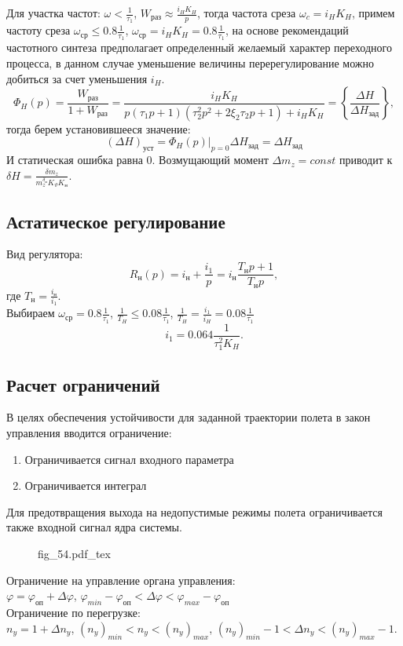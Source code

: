 \documentclass{article}
\newcommand{\incfig}[1]{
    {#1.pdf_tex}
}
\begin{document}
Для участка частот:
$\omega < \frac{1}{\tau_1}$, $W_\text{раз} \approx \frac{i_H K_H }{p} $, тогда
частота среза $\omega_c = i_H  K_H$, примем частоту среза $\omega_\text{ср} \le
	0.8 \frac{1}{\tau_1}$, $\omega_\text{ср} = i_H K_H =0.8 \frac{1}{\tau_1} $, на
основе рекомендаций частотного синтеза предполагает определенный желаемый
характер переходного процесса, в данном случае уменьшение величины
перерегулирование можно добиться за счет уменьшения $i_H$.
\[
	\Phi_H (p) =\frac{W_\text{раз}}{1 + W_\text{раз}} =\frac{i_H K_H}{p(\tau_1
		p +1)(\tau_2^2 p^2 + 2 \xi_2 \tau_2 p + 1) + i_H K_H} = \left\{
	\frac{\Delta H}{\Delta H_\text{зад}} \right\},
\]
тогда берем установившееся значение:
\[
	(\Delta H)_\text{уст} = \Phi_H(p)|_{p=0} \Delta H_\text{зад} = \Delta
	H_\text{зад}
\]
И статическая ошибка равна 0. Возмущающий момент $\Delta m_z = const$ приводит
к $\delta H =\frac{\delta m_z}{m_z^{\delta_\text{н}} K_\vartheta K_\text{н}}$.

\subsection{Астатическое регулирование}
Вид регулятора:
\[
	R_\text{н}(p) = i_\text{н} +\frac{i_1}{p}  = i_\text{н} \frac{T_\text{н} p
		+ 1}{T_\text{н} p},
\]
где $T_\text{н} =\frac{i_\text{н}}{i_1}$.\\
Выбираем $\omega_\text{ср} = 0.8 \frac{1}{\tau_1}$, $\frac{1}{T_H} \le
	0.08\frac{1}{\tau_1}$, $\frac{1}{T_H} = \frac{i_1}{i_H} = 0.08\frac{1}{\tau_1}$
\[
	i_1 = 0.064 \frac{1}{\tau_1^2 K_H}
	.\]

\subsection{Расчет ограничений}
В целях обеспечения устойчивости для заданной траектории полета в закон
управления вводится ограничение:
\begin{enumerate}
	\item Ограничивается сигнал входного параметра
	\item Ограничивается интеграл
\end{enumerate}

Для предотвращения выхода на недопустимые режимы полета ограничивается также
входной сигнал ядра системы.
\begin{figure}[H]
	\centering
	\incfig{fig_54}
	\label{fig:fig_54}
\end{figure}

Ограничение на управление органа управления:\\
$\varphi = \varphi_\text{оп} + \Delta \varphi$, $\varphi_{min} -
	\varphi_\text{оп} < \Delta \varphi < \varphi_{max} - \varphi_\text{оп}$\\
Ограничение по перегрузке:\\
$n_y = 1 + \Delta n_y$, $(n_y)_{min} < n_y < (n_y)_{max}$, $(n_y)_{min} - 1 <
	\Delta n_y < (n_y)_{max} - 1$.
\end{document}
